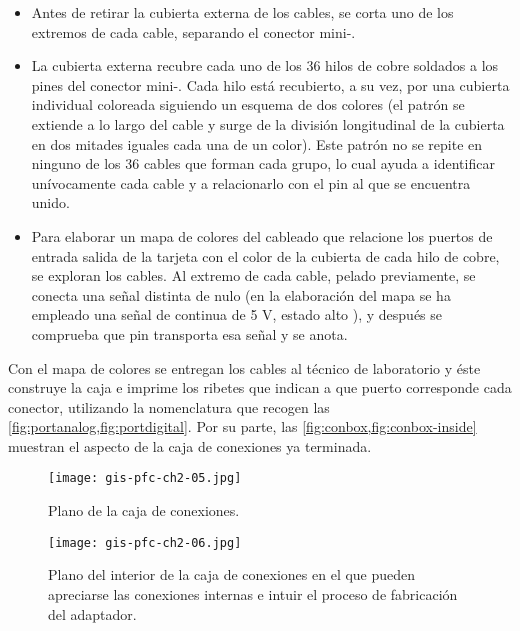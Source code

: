 \begin{itemize}
	\item Antes de retirar la cubierta externa de los cables, se corta
		uno de los extremos de cada cable, separando el conector
		mini-.
	\item La cubierta externa recubre cada uno de los 36 hilos de cobre
		soldados a los pines del conector mini-. Cada hilo
		está recubierto, a su vez, por una cubierta individual
		coloreada siguiendo un esquema de dos colores (el patrón se
		extiende a lo largo del cable y surge de la división
		longitudinal de la cubierta en dos mitades iguales cada una
		de un color). Este patrón no se repite en ninguno de los 36
		cables que forman cada grupo, lo cual ayuda a identificar
		unívocamente cada cable y a relacionarlo con el pin al que
		se encuentra unido.
	\item Para elaborar un mapa de colores del cableado que relacione
		los puertos de entrada salida de la tarjeta con el color de
		la cubierta de cada hilo de cobre, se exploran los cables.
		Al extremo de cada cable, pelado previamente, se conecta
		una señal distinta de nulo (en la elaboración del mapa se
		ha empleado una señal de continua de 5 V, estado alto
		), y después se comprueba que pin transporta esa
		señal y se anota.
\end{itemize}

Con el mapa de colores se entregan los cables al técnico de laboratorio y
éste construye la caja e imprime los ribetes que indican a que puerto
corresponde cada conector, utilizando la nomenclatura que recogen las
\vref{fig:portanalog,fig:portdigital}. Por su parte, las
\cref{fig:conbox,fig:conbox-inside} muestran el aspecto de la caja de
conexiones ya terminada.

\begin{figure}
	\begin{center}
		\texttt{[image: gis-pfc-ch2-05.jpg]}
	\end{center}
	\caption[Caja de conexiones, accesorio terminado]{Plano de la caja
	de conexiones.}
	\label{fig:conbox}
\end{figure}

\begin{figure}
	\begin{center}
		\texttt{[image: gis-pfc-ch2-06.jpg]}
	\end{center}
	\caption[Caja de conexiones, vista del interior]{Plano del interior
	de la caja de conexiones en el que pueden apreciarse las conexiones
	internas e intuir el proceso de fabricación del adaptador.}
	\label{fig:conbox-inside}
\end{figure}
